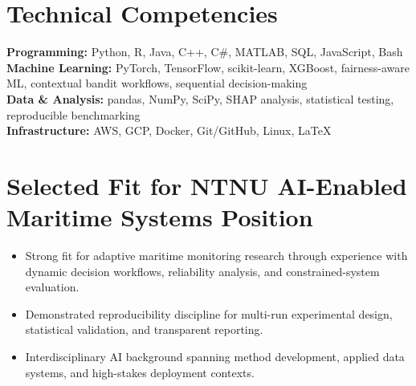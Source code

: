 \documentclass[11pt]{article}
\begin{document}
\section{Technical Competencies}
\textbf{Programming:} Python, R, Java, C++, C\#, MATLAB, SQL, JavaScript, Bash\\
\textbf{Machine Learning:} PyTorch, TensorFlow, scikit-learn, XGBoost, fairness-aware ML, contextual bandit workflows, sequential decision-making\\
\textbf{Data \& Analysis:} pandas, NumPy, SciPy, SHAP analysis, statistical testing, reproducible benchmarking\\
\textbf{Infrastructure:} AWS, GCP, Docker, Git/GitHub, Linux, LaTeX

\section{Selected Fit for NTNU AI-Enabled Maritime Systems Position}
\begin{itemize}
  \item Strong fit for adaptive maritime monitoring research through experience with dynamic decision workflows, reliability analysis, and constrained-system evaluation.
  \item Demonstrated reproducibility discipline for multi-run experimental design, statistical validation, and transparent reporting.
  \item Interdisciplinary AI background spanning method development, applied data systems, and high-stakes deployment contexts.
\end{itemize}
\end{document}
